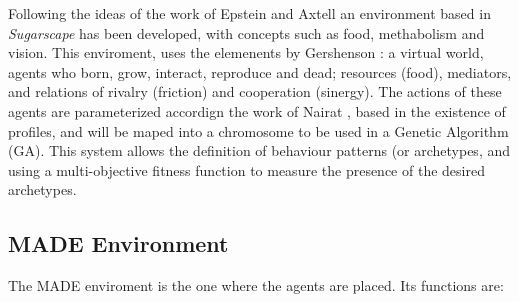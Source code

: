 \documentclass[runningheads]{llncs}
\begin{document}
Following the ideas of the work of Epstein and Axtell \cite{epstein1996growing} an environment based in {\em Sugarscape} has been developed, with concepts such as food, methabolism and vision. This enviroment, uses the elemenents  by Gershenson \cite{gershenson2005general}: a virtual world, agents who born, grow, interact, reproduce and dead; resources (food), mediators, and relations of rivalry (friction) and cooperation (sinergy). The actions of these agents are parameterized accordign the work of Nairat \cite{nairat2011character}, based in the existence of profiles, and will be maped into a chromosome to be used in a Genetic Algorithm (GA). This system allows the definition of behaviour patterns (or archetypes, and using a multi-objective fitness function to measure the presence of the desired archetypes. %


\subsection{MADE Environment}
The MADE enviroment is the one where the agents are placed. Its functions are:
\end{document}
